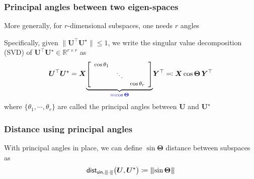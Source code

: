 \documentclass[compress,
mathserif,wide,%
]{beamer}
\begin{document}
\begin{frame}
\frametitle{Principal angles between two eigen-spaces}


More generally, for $r$-dimensional subspaces, one needs $r$ angles

\bigskip
\bigskip


Specifically, given $\|\bm{U}^{\top}\bm{U}^{\star}\| \leq 1$, we  write the singular value decomposition (SVD) of $\bm{U}^{\top}\bm{U}^{\star} \in\mathbb{R}^{r\times r}$ as
%
\[
	\bm{U}^{\top}\bm{U}^{\star}
	=\bm{X} {\footnotesize  \underset{\textcolor{blue}{ \eqqcolon\cos \bm{\Theta}}}{\underbrace{ \left[\begin{array}{ccc}
		\cos\theta_{1}\\
 		& \ddots\\
 		&  & \cos\theta_{r}
	\end{array}\right]} }}
	\bm{Y}^{\top} \eqqcolon \bm{X}\cos\bm{\Theta}\,\bm{Y}^{\top}
\]
%
where $\{\theta_{1},\cdots,\theta_{r}\}$ are called the \alert{principal angles}
between $\bm{U}$ and $\bm{U}^\star$

\end{frame}


\begin{frame}
	\frametitle{Distance using principal angles}
With principal angles in place, we can define $\sin\bm{\Theta}$ distance between subspaces as
	\begin{equation*}
	\mathsf{dist}_{\mathsf{sin},{\left\vert\kern-0.25ex\left\vert\kern-0.25ex\left\vert \cdot \right\vert\kern-0.25ex\right\vert\kern-0.25ex\right\vert}}\big(\bm{U}, {\bm{U}}^{\star} \big) \coloneqq {\left\vert\kern-0.25ex\left\vert\kern-0.25ex\left\vert \sin\bm{\Theta} \right\vert\kern-0.25ex\right\vert\kern-0.25ex\right\vert}
\end{equation*}
\end{frame}
\end{document}
